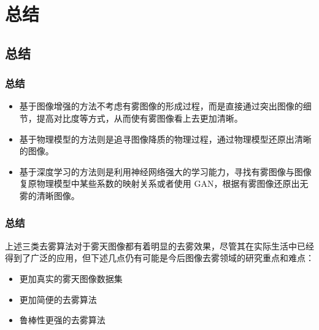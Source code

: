     \section{总结}
    \subsection{总结}

    \begin{frame}
      \frametitle{总结}
      \begin{itemize}
        \item 基于图像增强的方法不考虑有雾图像的形成过程，而是直接通过突出图像的细节，提高对比度等方式，从而使有雾图像看上去更加清晰。
        \item 基于物理模型的方法则是追寻图像降质的物理过程，通过物理模型还原出清晰的图像。
        \item 基于深度学习的方法则是利用神经网络强大的学习能力，寻找有雾图像与图像复原物理模型中某些系数的映射关系或者使用 GAN，根据有雾图像还原出无雾的清晰图像。
      \end{itemize}
    \end{frame}

    \begin{frame}
      \frametitle{总结}
      上述三类去雾算法对于雾天图像都有着明显的去雾效果，尽管其在实际生活中已经得到了广泛的应用，但下述几点仍有可能是今后图像去雾领域的研究重点和难点：
      \begin{itemize}
        \item 更加真实的雾天图像数据集
        \item 更加简便的去雾算法
        \item 鲁棒性更强的去雾算法
      \end{itemize}
    \end{frame}

    \begin{frame}
      
    \end{frame}

